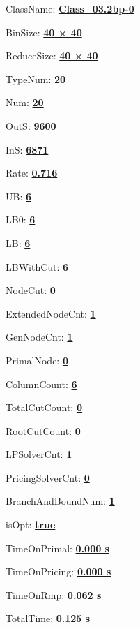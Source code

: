 \documentclass[11pt]{article}
\begin{document}
\pagestyle{empty}


ClassName: \underline{\textbf{Class_03.2bp-0}}
\par
BinSize: \underline{\textbf{40 × 40}}
\par
ReduceSize: \underline{\textbf{40 × 40}}
\par
TypeNum: \underline{\textbf{20}}
\par
Num: \underline{\textbf{20}}
\par
OutS: \underline{\textbf{9600}}
\par
InS: \underline{\textbf{6871}}
\par
Rate: \underline{\textbf{0.716}}
\par
UB: \underline{\textbf{6}}
\par
LB0: \underline{\textbf{6}}
\par
LB: \underline{\textbf{6}}
\par
LBWithCut: \underline{\textbf{6}}
\par
NodeCut: \underline{\textbf{0}}
\par
ExtendedNodeCnt: \underline{\textbf{1}}
\par
GenNodeCnt: \underline{\textbf{1}}
\par
PrimalNode: \underline{\textbf{0}}
\par
ColumnCount: \underline{\textbf{6}}
\par
TotalCutCount: \underline{\textbf{0}}
\par
RootCutCount: \underline{\textbf{0}}
\par
LPSolverCnt: \underline{\textbf{1}}
\par
PricingSolverCnt: \underline{\textbf{0}}
\par
BranchAndBoundNum: \underline{\textbf{1}}
\par
isOpt: \underline{\textbf{true}}
\par
TimeOnPrimal: \underline{\textbf{0.000 s}}
\par
TimeOnPricing: \underline{\textbf{0.000 s}}
\par
TimeOnRmp: \underline{\textbf{0.062 s}}
\par
TotalTime: \underline{\textbf{0.125 s}}
\par
\newpage


\end{document}
